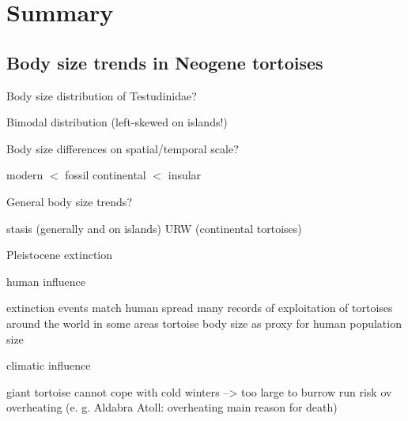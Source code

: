 \section{Summary}

\subsection{Body size trends in Neogene tortoises}

\begin{frame}
\begin{enumerate}[<+->]
\p Body size distribution of Testudinidae?
\begin{itemize}
	\p[\pf] Bimodal distribution (left-skewed on islands!)
\end{itemize}
\p Body size differences on spatial/temporal scale?
\begin{itemize}
	\p[\pf] modern $<$ fossil
	\p[\pf] continental $<$ insular
\end{itemize}
\p General body size trends?
\begin{itemize}
	\p[\pf] stasis (generally and on islands)
	\p[\pf] URW (continental tortoises)
\end{itemize}


\end{enumerate}
\end{frame}



\begin{frame}{Pleistocene extinction}
\begin{itemize}[<+->]
	\p human influence
	\begin{itemize}
		\p extinction events match human spread
		\p many records of exploitation of tortoises around the world
		\p in some areas tortoise body size as proxy for human population size
	\end{itemize} 
	\p climatic influence
	\begin{itemize}
		\p giant tortoise cannot cope with cold winters --> too large to burrow
		\p run risk ov overheating (e. g. Aldabra Atoll: overheating main reason for death)
	\end{itemize}
	
\end{itemize}
\end{frame}